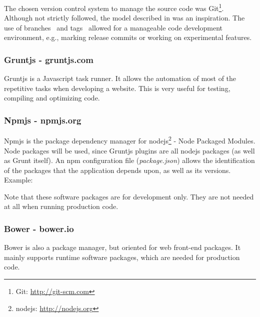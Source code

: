       The chosen version control system to manage the source code was Git\footnote{Git: \url{http://git-scm.com}}. \\
      Although not strictly followed, the model described in \cite{nviebranching} was an inspiration.
      The use of branches~\cite{gitbranches} and tags~\cite{gittags} allowed for a manageable code development environment, e.g., marking release commits or working on experimental features.


    \subsubsection{Gruntjs - gruntjs.com} %
      \label{ssub:gruntjs}
        Gruntjs is a Javascript task runner.
        It allows the automation of most of the repetitive tasks when developing a website.
        This is very useful for testing, compiling and optimizing code.

    \subsubsection{Npmjs - npmjs.org} %
    \label{ssub:npm}
      Npmjs is the package dependency manager for nodejs\footnote{nodejs: \url{http://nodejs.org}} - Node Packaged Modules.
      Node packages will be used, since Gruntjs plugins are all nodejs packages (as well as Grunt itself).
      An npm configuration file (\emph{package.json}) allows the identification of the packages that the application depends upon, as well as its versions.
      Example: 

      

      Note that these software packages are for development only. They are not needed at all when running production code.

    \subsubsection{Bower - bower.io} %
    \label{ssub:bower}
    
    Bower is also a package manager, but oriented for web front-end packages.
    It mainly supports runtime software packages, which are needed for production code.


